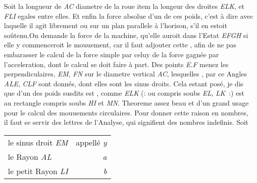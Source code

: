 \pend 
\pstart Soit  la longueur de \textit{AC} diametre de la roue item la longeur des droites \textit{ELK}, et \textit{FLI} egales entre elles. 
\pend 
\pstart Et enfin la force absolue\protect{} d'un de ces poids\protect{}, c'est \`{a} dire avec laquelle il agit librement ou sur un plan parallele \`{a} l'horison, s'il en estoit so\^{u}tenu.\pend \pstart On demande la force de la machine\protect{}, qu'elle auroit dans l'Estat \textit{EFGH} si elle y commenceroit le mouuement, car il faut adjouter cette , afin de ne pas embarasser le calcul de la force\protect{} simple par celuy de la force gagn\'{e}e par l'acceleration, dont le calcul\protect{} se doit faire \`{a} part.
\pend 
\pstart Des points \textit{E.F} menez les perpendiculaires, \textit{EM}, \textit{FN} sur le diametre vertical \textit{AC}, lesquelles , par ce  Angles \textit{ALE}, \textit{CLF} sont donn\'{e}s, dont elles sont les sinus droits.
\pend 
\newpage
\pstart Cela estant pos\'{e}, je dis que  d'un des poids\protect{} susdits est , comme  \textit{ELK} (: ou compris soubs \textit{EL}, \textit{LK}~:) est au rectangle compris soubs \textit{HI} et \textit{MN}. Theoreme\protect{} assez beau et d'un grand usage pour le calcul des mouuements circulaires.
\pend 
\pstart Pour donner cette raison en nombres, il faut se servir des lettres de l'Analyse\protect{}, qui signifient des nombres indefinis. 
\pend 
\count{}
\count{}
\pstart%
Soit
\begin{tabular}[t]{lr}
le sinus droit \textit{EM}&appell\'{e} \textit{y}\hspace{0.1mm}\\
le Rayon \textit{AL}&\dotfill \textit{a}\\
le petit Rayon \textit{LI}&\dotfill \textit{b}\\
\end{tabular}
